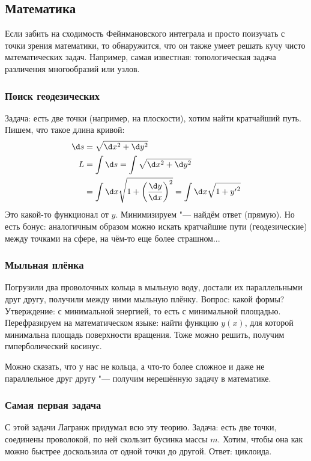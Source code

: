 \subsection{Математика}
	Если забить на сходимость Фейнмановского интеграла и просто поизучать с точки зрения математики,
	то обнаружится, что он также умеет решать кучу чисто математических задач.
	Например, самая известная: топологическая задача различения многообразий или узлов.

	\subsubsection{Поиск геодезических}
		Задача: есть две точки (например, на плоскости), хотим найти кратчайший путь.
		Пишем, что такое длина кривой:
		\begin{align*}
			\d s &= \sqrt{\d x ^ 2 + \d y ^ 2} \\
			L &= \int \d s
			  = \int \sqrt{\d x ^ 2 + \d y ^ 2} \\
			  &= \int \d x \sqrt{1 + \left(\frac{\d y}{\d x}\right) ^ 2}
			  = \int \d x \sqrt{1 + {y'}^ 2}
		\end{align*}
		Это какой-то функционал от $y$.
		Минимизируем "--- найдём ответ (прямую).
		Но есть бонус: аналогичным образом можно искать кратчайшие пути (геодезические) между точками на сфере, на чём-то еще более страшном...

	\subsubsection{Мыльная плёнка}
		Погрузили два проволочных кольца в мыльную воду, достали их параллельными друг другу, получили между ними мыльную плёнку.
		Вопрос: какой формы?
		Утверждение: с минимальной энергией, то есть с минимальной площадью.
		Перефразируем на математическом языке: найти функцию $y(x)$, для которой минимальна площадь поверхности вращения.
		Тоже можно решить, получим гмперболический косинус.

		Можно сказать, что у нас не кольца, а что-то более сложное и даже не параллельное друг другу "--- получим нерешённую задачу в математике.

	\subsubsection{Самая первая задача}
		С этой задачи Лагранж придумал всю эту теорию.
		Задача: есть две точки, соединены проволокой, по ней скользит бусинка массы $m$.
		Хотим, чтобы она как можно быстрее доскользила от одной точки до другой.
		Ответ: циклоида.


